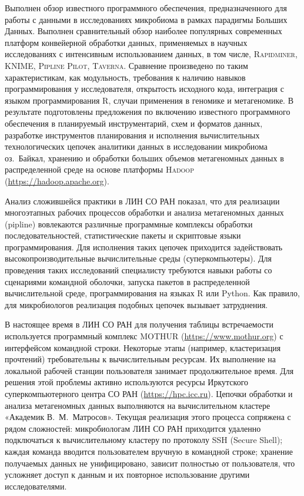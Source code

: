 \documentclass[a4paper,12pt,openany,final]{extreport}
\begin{document}
Выполнен обзор известного программного обеспечения, предназначенного для работы с данными в исследованиях микробиома в рамках парадигмы Больших Данных. Выполнен сравнительный обзор наиболее популярных современных платформ конвейерной обработки данных, применяемых в научных исследованиях с интенсивным использованием данных, в том числе, \textsc{Rapidminer}, \textsc{KNIME}, \textsc{Pipline Pilot}, \textsc{Taverna}. Сравнение произведено по таким характеристикам, как модульность, требования к наличию навыков программирования у исследователя, открытость исходного кода, интеграция с языком программирования R, случаи применения в геномике и метагеномике. В результате подготовлены предложения по включению известного программного обеспечения в планируемый инструментарий, схем и форматов данных, разработке инструментов планирования и исполнения вычислительных технологических цепочек аналитики данных в исследовании микробиома оз.~Байкал, хранению и обработки больших объемов метагеномных данных в распределенной среде на основе платформы \textsc{Hadoop} (\href{https://hadoop.apache.org/}{{https://hadoop.apache.org}}).

Анализ сложившейся практики в ЛИН СО РАН показал, что для реализации многоэтапных рабочих процессов обработки и анализа метагеномных данных (pipline) вовлекаются различные программные комплексы обработки последовательностей, статистические пакеты и скриптовые языки программирования. Для исполнения таких цепочек приходится задействовать высокопроизводительные вычислительные среды (суперкомпьютеры). Для проведения таких исследований специалисту требуются навыки работы со сценариями командной оболочки, запуска пакетов в распределенной вычислительной среде, программирования на языках R или Python. Как правило, для микробиологов реализация подобных цепочек вызывает затруднения.

В настоящее время в ЛИН СО РАН для получения таблицы встречаемости используется программный комплекс MOTHUR (\href{https://www.mothur.org}{{https://www.mothur.org}}) с интерфейсом командной строки. Некоторые этапы (например, кластеризация прочтений) требовательны к вычислительным ресурсам. Их выполнение на локальной рабочей станции пользователя занимает продолжительное время. Для решения этой проблемы активно используются ресурсы Иркутского суперкомпьютерного центра СО РАН (\url{https://hpc.icc.ru}). Цепочки обработки и анализа метагеномных данных выполняются на вычислительном кластере «Академик В.~М.~Матросов». Текущая реализация этого процесса сопряжена с рядом сложностей: микробиологам ЛИН СО РАН приходится удаленно подключаться к вычислительному кластеру по протоколу SSH (Secure Shell); каждая команда вводится пользователем вручную в командной строке; хранение получаемых данных не унифицировано, зависит полностью от пользователя, что усложняет доступ к данным и их повторное использование другими исследователями.
\end{document}
